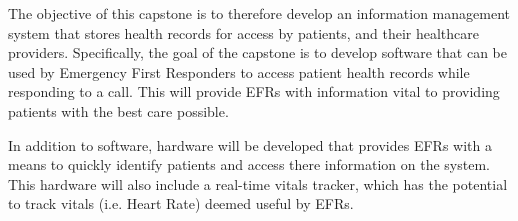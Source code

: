 The objective of this capstone is to therefore develop an information management system that stores health records for access by patients, and their healthcare providers. Specifically, the goal of the capstone is to develop software that can be used by Emergency First Responders to access patient health records while responding to a call. This will provide EFRs with information vital to providing patients with the best care possible.

In addition to software, hardware will be developed that provides EFRs with a means to quickly identify patients and access there information on the system. This hardware will also include a real-time vitals tracker, which has the potential to track vitals (i.e. Heart Rate) deemed useful by EFRs.
